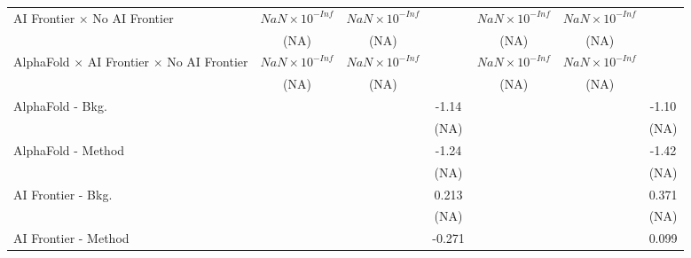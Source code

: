 \begin{tabular}{lcccccc}
   AI Frontier $\times$ No AI Frontier                                        & $NaN\times 10^{-Inf}$  & $NaN\times 10^{-Inf}$  &                        & $NaN\times 10^{-Inf}$  & $NaN\times 10^{-Inf}$  &   \\   
                                                                              & (NA)                   & (NA)                   &                        & (NA)                   & (NA)                   &   \\   
   AlphaFold $\times$ AI Frontier $\times$ No AI Frontier                     & $NaN\times 10^{-Inf}$  & $NaN\times 10^{-Inf}$  &                        & $NaN\times 10^{-Inf}$  & $NaN\times 10^{-Inf}$  &   \\   
                                                                              & (NA)                   & (NA)                   &                        & (NA)                   & (NA)                   &   \\   
   AlphaFold - Bkg.                                                           &                        &                        & -1.14                  &                        &                        & -1.10\\   
                                                                              &                        &                        & (NA)                   &                        &                        & (NA)\\   
   AlphaFold - Method                                                         &                        &                        & -1.24                  &                        &                        & -1.42\\   
                                                                              &                        &                        & (NA)                   &                        &                        & (NA)\\   
   AI Frontier - Bkg.                                                         &                        &                        & 0.213                  &                        &                        & 0.371\\   
                                                                              &                        &                        & (NA)                   &                        &                        & (NA)\\   
   AI Frontier - Method                                                       &                        &                        & -0.271                 &                        &                        & 0.099\\   

\end{tabular}
